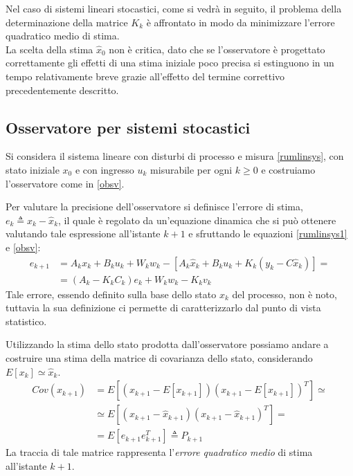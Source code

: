 Nel caso di sistemi lineari stocastici, come si vedrà in seguito, il problema della determinazione della matrice $K_k$ è affrontato in modo da minimizzare l'errore quadratico medio di stima.\\
La scelta della stima $\hat{x}_0$ non è critica, dato che se l'osservatore è progettato correttamente gli effetti di una stima iniziale poco precisa si estinguono in un tempo relativamente breve grazie all'effetto del termine correttivo precedentemente descritto.

\subsection{Osservatore per sistemi stocastici}
Si considera il sistema lineare con disturbi di processo e misura \eqref{rumlinsys}, con stato iniziale $x_0$ e con ingresso $u_k$ misurabile per ogni $k \geq 0$ e costruiamo l'osservatore come in \eqref{obsv}.

Per valutare la precisione dell'osservatore si definisce l'errore di stima, \\ $e_k \triangleq x_k-\hat{x}_k$, il quale è regolato da un'equazione dinamica che si può ottenere valutando tale espressione all'istante $k+1$ e sfruttando le equazioni \eqref{rumlinsys1} e \eqref{obsv}:
\begin{equation}
\label{errore}
\begin{split}
e_{k+1}&=A_kx_k+B_ku_k+W_kw_k-[A_k\hat{x}_k+B_ku_k+K_k(y_k-C\hat{x}_k)] = \\
&=(A_k-K_kC_k)e_k+W_kw_k-K_kv_k
\end{split}
\end{equation}
Tale errore, essendo definito sulla base dello stato $x_k$ del processo, non è noto, tuttavia la sua definizione ci permette di caratterizzarlo dal punto di vista statistico.

Utilizzando la stima dello stato prodotta dall'osservatore possiamo andare a costruire una stima della matrice di covarianza dello stato, considerando $E[x_k] \simeq \hat{x}_k$.
\begin{equation}
\label{matrcov}
\begin{split}
Cov(x_{k+1})&=E[(x_{k+1}-E[x_{k+1}])(x_{k+1}-E[x_{k+1}])^T] \simeq\\
&\simeq E[(x_{k+1}-\hat{x}_{k+1})(x_{k+1}-\hat{x}_{k+1})^T]=\\
&=E[e_{k+1}e_{k+1}^T] \triangleq P_{k+1}
\end{split}
\end{equation}
La traccia di tale matrice rappresenta l'\textit{errore quadratico medio} di stima all'istante $k+1$.

